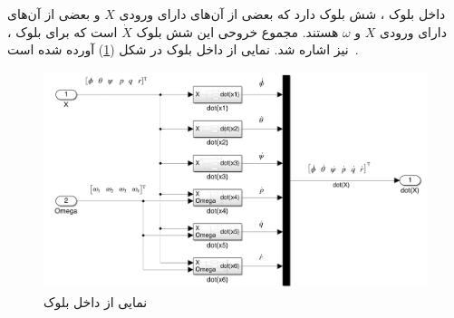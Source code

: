داخل بلوک
،
شش بلوک دارد که بعضی از آن‌های دارای ورودی $X$ و بعضی از آن‌های دارای ورودی $X$ و $\omega$ هستند. مجموع خروحی این شش بلوک $\dot X$ است که برای بلوک
،
 نیز اشاره شد.
نمایی از داخل بلوک
در شکل (\ref{all-six}) آورده شده است.
\begin{figure}[H]
	\includegraphics[width=16cm]{../../Figures/QuadSimulation/all-six.png}
	\centering
	\caption{نمایی از داخل بلوک }
	\label{all-six}
\end{figure}